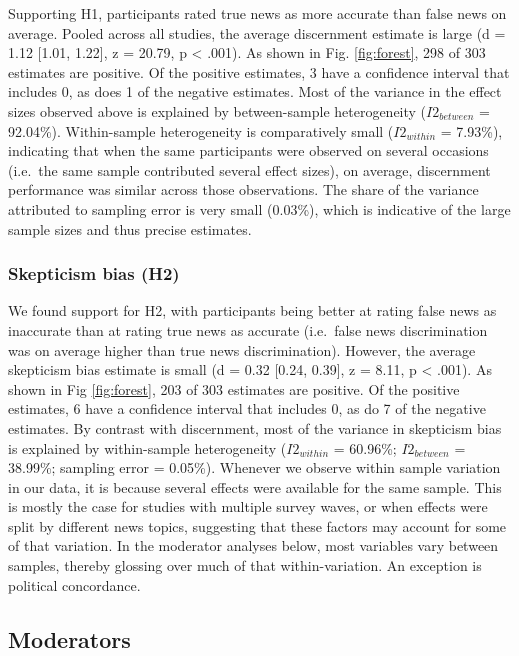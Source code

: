 \documentclass[
  man]{apa6}
\begin{document}
Supporting H1, participants rated true news as more accurate than false news on average. Pooled across all studies, the average discernment estimate is large (d = 1.12 {[}1.01, 1.22{]}, z = 20.79, p \textless{} .001). As shown in Fig. \ref{fig:forest}, 298 of 303 estimates are positive. Of the positive estimates, 3 have a confidence interval that includes 0, as does 1 of the negative estimates. Most of the variance in the effect sizes observed above is explained by between-sample heterogeneity (\(I2_{between}\) = 92.04\%). Within-sample heterogeneity is comparatively small (\(I2_{within}\) = 7.93\%), indicating that when the same participants were observed on several occasions (i.e.~the same sample contributed several effect sizes), on average, discernment performance was similar across those observations. The share of the variance attributed to sampling error is very small (0.03\%), which is indicative of the large sample sizes and thus precise estimates.

\subsubsection{Skepticism bias (H2)}\label{skepticism-bias-h2}

We found support for H2, with participants being better at rating false news as inaccurate than at rating true news as accurate (i.e.~false news discrimination was on average higher than true news discrimination). However, the average skepticism bias estimate is small (d = 0.32 {[}0.24, 0.39{]}, z = 8.11, p \textless{} .001). As shown in Fig \ref{fig:forest}, 203 of 303 estimates are positive. Of the positive estimates, 6 have a confidence interval that includes 0, as do 7 of the negative estimates. By contrast with discernment, most of the variance in skepticism bias is explained by within-sample heterogeneity (\(I2_{within}\) = 60.96\%; \(I2_{between}\) = 38.99\%; sampling error = 0.05\%). Whenever we observe within sample variation in our data, it is because several effects were available for the same sample. This is mostly the case for studies with multiple survey waves, or when effects were split by different news topics, suggesting that these factors may account for some of that variation. In the moderator analyses below, most variables vary between samples, thereby glossing over much of that within-variation. An exception is political concordance.

\subsection{Moderators}\label{moderators}
\end{document}
